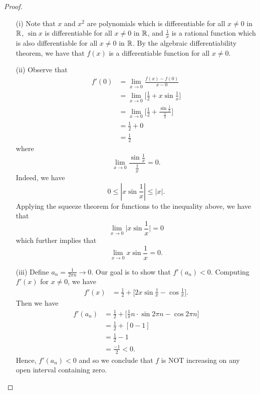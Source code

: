 \documentclass[a4paper]{article}
\begin{document}
\begin{proof}
\begin{enumerate}
    \item[(i)] Note that \( x  \) and \( x^{2} \) are polynomials which is differentiable for all \( x \neq 0  \) in \( \mathbb{R}  \), \( \sin x  \) is differentiable for all \( x \neq 0  \) in \( \mathbb{R}  \), and \( \frac{ 1 }{ x }  \) is a rational function which is also differentiable for all \( x \neq 0  \) in \( \mathbb{R}  \). By the algebraic differentiability theorem, we have that \( f(x) \) is a differentiable function for all \( x \neq 0  \).
    \item[(ii)] Observe that
        \begin{align*}
            f'(0) &= \lim_{ x \to 0 }  \frac{ f(x) - f(0) }{ x - 0  }  \\
                  &= \lim_{ x \to 0 }  \Big[ \frac{ 1 }{ 2 }  + x \sin \frac{ 1 }{ x } \Big] \\
                  &= \lim_{ x \to 0 }  \Big[ \frac{ 1 }{ 2 }  + \frac{ \sin \frac{ 1 }{ x }  }{ \frac{ 1 }{ x }  } \Big]  \\
                  &= \frac{ 1 }{ 2 } + 0 \tag{Algebraic Limit Theorem}  \\ 
                  &= \frac{ 1 }{ 2 }
        \end{align*}
        where 
        \[  \lim_{ x \to 0 }  \frac{ \sin \frac{ 1 }{ x }  }{ \frac{ 1 }{ x }  } = 0. \]
        Indeed, we have 
        \[  0 \leq | x \sin \frac{ 1 }{ x }  | \leq | x  |. \]
        Applying the squeeze theorem for functions to the inequality above, we have that 
        \[  \lim_{ x \to 0 }  \Big| x \sin \frac{ 1 }{ x }  \Big|  = 0  \]
        which further implies that 
        \[  \lim_{ x \to 0 }  x \sin \frac{ 1 }{ x }  = 0.  \]

    \item[(iii)] Define \( a_{n} = \frac{ 1 }{ 2 \pi n  }  \to 0  \). Our goal is to show that \( f'({a}_{n}) < 0  \). Computing \( f'(x ) \) for \( x \neq 0  \), we have 
        \begin{align*}
           f'(x) &= \frac{ 1 }{ 2 }  + \Big[ 2x \sin \frac{ 1 }{ x }  - \cos \frac{ 1 }{ x } \Big]. 
        \end{align*}
        Then we have 
        \begin{align*}
            f'({a}_{n}) &= \frac{ 1 }{ 2 }  + \Big[ \frac{ 1 }{ \pi  } n \cdot \sin 2 \pi n - \cos 2 \pi n \Big] \\
                        &= \frac{ 1 }{ 2 }  + [0 -  1] \\
                        &= \frac{ 1 }{ 2 }  - 1 \\
                        &= \frac{ -1 }{ 2 } < 0.  
        \end{align*}
        Hence, \( f'({a}_{n})  < 0 \) and so we conclude that \( f  \) is NOT increasing on any open interval containing zero. 
\end{enumerate}
\end{proof}
\end{document}
